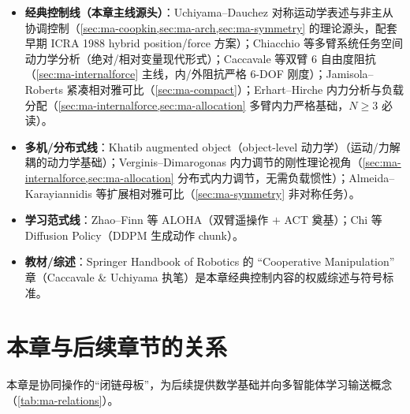 \begin{itemize}
  \item \textbf{经典控制线（本章主线源头）}：Uchiyama--Dauchez 对称运动学表述与非主从协调控制\cite{uchiyama1993symmetric}（\cref{sec:ma-coopkin,sec:ma-arch,sec:ma-symmetry} 的理论源头，配套早期 ICRA 1988 hybrid position/force 方案\cite{uchiyama1987symmetric}）；Chiacchio 等多臂系统任务空间动力学分析\cite{chiacchio1996task}（绝对/相对变量现代形式）；Caccavale 等双臂 $6$ 自由度阻抗\cite{caccavale2008sixdof}（\cref{sec:ma-internalforce} 主线，内/外阻抗严格 $6$-DOF 刚度）；Jamisola--Roberts 紧凑相对雅可比\cite{jamisola2015compact}（\cref{sec:ma-compact}）；Erhart--Hirche 内力分析与负载分配\cite{erhart2017internal}（\cref{sec:ma-internalforce,sec:ma-allocation} 多臂内力严格基础，$N\ge3$ 必读）。
  \item \textbf{多机/分布式线}：Khatib augmented object（object-level 动力学）\cite{khatib1988object}（运动/力解耦的动力学基础）；Verginis--Dimarogonas 内力调节的刚性理论视角\cite{verginis2019cooperative}（\cref{sec:ma-internalforce,sec:ma-allocation} 分布式内力调节，无需负载惯性）；Almeida--Karayiannidis 等扩展相对雅可比\cite{almeida2019asymmetric}（\cref{sec:ma-symmetry} 非对称任务）。
  \item \textbf{学习范式线}：Zhao--Finn 等 ALOHA\cite{zhao2023aloha}（双臂遥操作 $+$ ACT 奠基）；Chi 等 Diffusion Policy\cite{chi2023diffusion}（DDPM 生成动作 chunk）。
  \item \textbf{教材/综述}：Springer Handbook of Robotics 的 “Cooperative Manipulation” 章（Caccavale \& Uchiyama 执笔）是本章经典控制内容的权威综述与符号标准。
\end{itemize}

\section*{本章与后续章节的关系}
本章是协同操作的“闭链母板”，为后续提供数学基础并向多智能体学习输送概念（\cref{tab:ma-relations}）。

